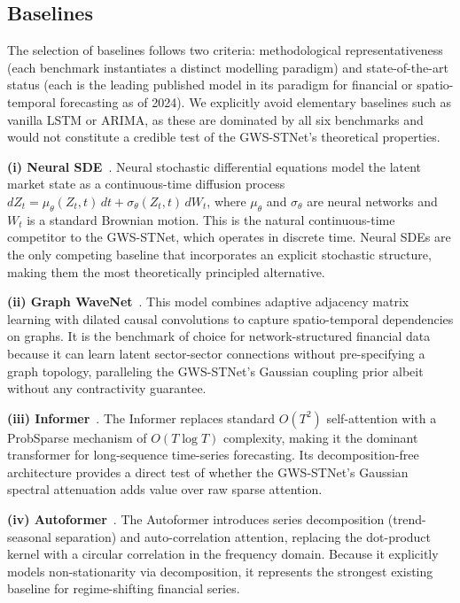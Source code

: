 \documentclass[11pt,a4paper]{article}  %
\theoremstyle{plain}
\theoremstyle{definition}
\theoremstyle{remark}
\begin{document}
\subsection{Baselines}
\label{subsec:baselines}

The selection of baselines follows two criteria: methodological
representativeness (each benchmark instantiates a distinct modelling
paradigm) and state-of-the-art status (each is the leading published
model in its paradigm for financial or spatio-temporal forecasting as
of 2024). We explicitly avoid elementary baselines such as vanilla
LSTM or ARIMA, as these are dominated by all six benchmarks and would
not constitute a credible test of the GWS-STNet's theoretical properties.

\textbf{(i) Neural SDE}~\cite{Kidger2021}. Neural stochastic
differential equations model the latent market state as a
continuous-time diffusion process $dZ_t = \mu_\theta(Z_t,t)\,dt +
\sigma_\theta(Z_t,t)\,dW_t$, where $\mu_\theta$ and $\sigma_\theta$
are neural networks and $W_t$ is a standard Brownian motion. This
is the natural continuous-time competitor to the GWS-STNet, which
operates in discrete time. Neural SDEs are the only competing
baseline that incorporates an explicit stochastic structure, making
them the most theoretically principled alternative.

\textbf{(ii) Graph WaveNet}~\cite{Wu2019}. This model combines
adaptive adjacency matrix learning with dilated causal convolutions
to capture spatio-temporal dependencies on graphs. It is the
benchmark of choice for network-structured financial data because
it can learn latent sector-sector connections without pre-specifying
a graph topology, paralleling the GWS-STNet's Gaussian coupling
prior albeit without any contractivity guarantee.

\textbf{(iii) Informer}~\cite{Zhou2021}. The Informer replaces
standard $O(T^2)$ self-attention with a ProbSparse mechanism of
$O(T\log T)$ complexity, making it the dominant transformer for
long-sequence time-series forecasting. Its decomposition-free
architecture provides a direct test of whether the GWS-STNet's
Gaussian spectral attenuation adds value over raw sparse attention.

\textbf{(iv) Autoformer}~\cite{Wu2021}. The Autoformer introduces
series decomposition (trend-seasonal separation) and auto-correlation
attention, replacing the dot-product kernel with a circular
correlation in the frequency domain. Because it explicitly models
non-stationarity via decomposition, it represents the strongest
existing baseline for regime-shifting financial series.
\end{document}
